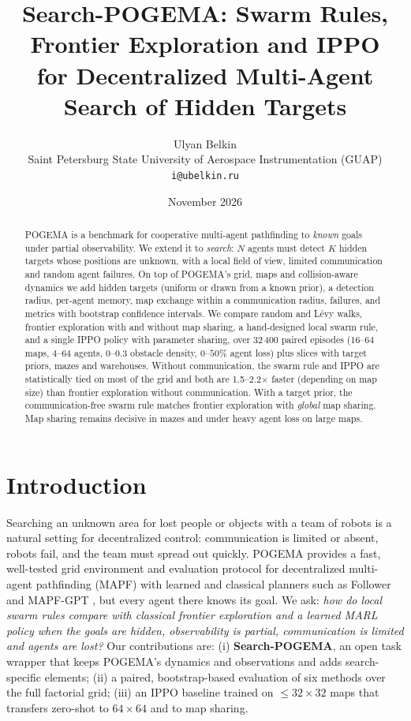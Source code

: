 \documentclass[10pt]{article}
\title{\vspace{-1.2cm}\textbf{Search-POGEMA: Swarm Rules, Frontier Exploration and IPPO\\
for Decentralized Multi-Agent Search of Hidden Targets}}
\author{Ulyan Belkin\\ \small Saint Petersburg State University of Aerospace Instrumentation (GUAP)\\
\small \texttt{i@ubelkin.ru}}
\date{\small November 2026}
\begin{document}
\maketitle
\vspace{-0.6cm}
\begin{abstract}
\noindent POGEMA is a benchmark for cooperative multi-agent pathfinding to \emph{known} goals under partial observability.
We extend it to \emph{search}: $N$ agents must detect $K$ hidden targets whose positions are unknown, with a local
field of view, limited communication and random agent failures. On top of POGEMA's grid, maps and collision-aware
dynamics we add hidden targets (uniform or drawn from a known prior), a detection radius, per-agent memory, map
exchange within a communication radius, failures, and metrics with bootstrap confidence intervals.
We compare random and L\'evy walks, frontier exploration with and without map sharing, a hand-designed local swarm
rule, and a single IPPO policy with parameter sharing, over 32\,400 paired episodes
($16$--$64$ maps, $4$--$64$ agents, $0$--$0.3$ obstacle density, $0$--$50\%$ agent loss) plus slices with target priors,
mazes and warehouses. Without communication, the swarm rule and IPPO are statistically tied on most of the grid and
both are 1.5--2.2$\times$ faster (depending on map size) than frontier exploration without communication. With a target prior, the
communication-free swarm rule matches frontier exploration with \emph{global} map sharing. Map sharing remains
decisive in mazes and under heavy agent loss on large maps.
\end{abstract}

\section{Introduction}
Searching an unknown area for lost people or objects with a team of robots is a natural setting for decentralized
control: communication is limited or absent, robots fail, and the team must spread out quickly. POGEMA
\cite{skrynnik2025pogema} provides a fast, well-tested grid environment and evaluation protocol for decentralized
multi-agent pathfinding (MAPF) with learned and classical planners such as Follower \cite{skrynnik2024follower} and
MAPF-GPT \cite{andreychuk2025mapfgpt}, but every agent there knows its goal. We ask: \emph{how do local swarm rules
compare with classical frontier exploration and a learned MARL policy when the goals are hidden, observability is
partial, communication is limited and agents are lost?} Our contributions are: (i) \textbf{Search-POGEMA}, an open
task wrapper that keeps POGEMA's dynamics and observations and adds search-specific elements; (ii) a paired,
bootstrap-based evaluation of six methods over the full factorial grid; (iii) an IPPO baseline trained on
$\le 32\times32$ maps that transfers zero-shot to $64\times64$ and to map sharing.
\end{document}
